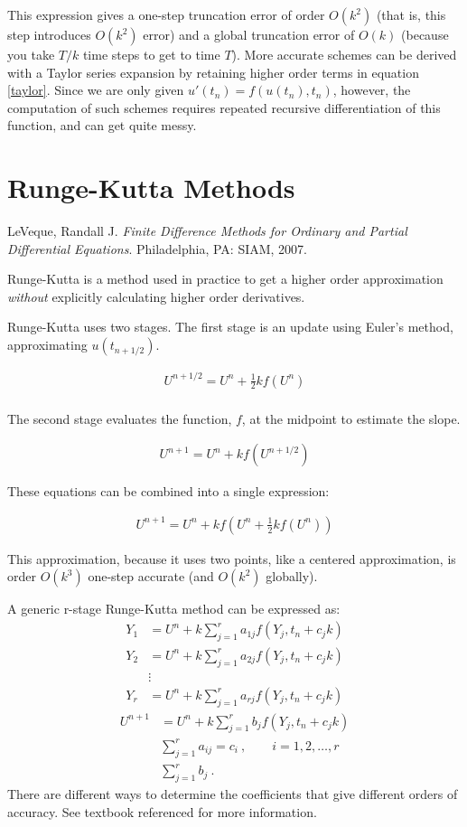 \documentclass[12pt]{article}
\begin{document}
This expression gives a one-step truncation error of order $O(k^2)$ (that is, this step introduces $O(k^2)$ error) and a global truncation error of $O(k)$ (because you take $T/k$ time steps to get to time $T$). More 
accurate schemes can be derived with a Taylor series expansion by retaining 
higher order terms in equation \eqref{taylor}. Since we are only given 
$u'(t_n) = f(u(t_n),t_n)$, however, the computation of such schemes requires 
repeated recursive differentiation of this function, and can get quite messy.


\section*{Runge-Kutta Methods}
LeVeque, Randall J. \textit{Finite Difference Methods for Ordinary and Partial Differential Equations}. Philadelphia, PA: SIAM, 2007. 

Runge-Kutta is a method used in practice to get a higher order approximation 
\emph{without} explicitly calculating higher order derivatives.

Runge-Kutta uses two stages. The first stage is an update using Euler's method, 
approximating $u(t_{n+1/2})$. 

\begin{align}
U^{n+1/2} = U^n + \frac{1}{2}kf(U^n)\\
\end{align}

The second stage evaluates the function, $f$, at the midpoint to estimate the 
slope.

\begin{align}
U^{n+1} = U^n + kf(U^{n+1/2})
\end{align}

These equations can be combined into a single expression:

\begin{align}
U^{n+1} = U^n + kf(U^n + \frac{1}{2}kf(U^n))
\end{align}

This approximation, because it uses two points, like a centered approximation, 
is order $O(k^3)$ one-step accurate (and $O(k^2)$ globally).

A generic r-stage Runge-Kutta method can be expressed as:
\begin{align}
Y_1 &= U^n + k\sum_{j=1}^r a_{1j}f(Y_j, t_n + c_jk)\\
Y_2 &= U^n + k\sum_{j=1}^r a_{2j}f(Y_j, t_n + c_jk)\\
&\vdots\nonumber\\
Y_r &= U^n + k\sum_{j=1}^r a_{rj}f(Y_j, t_n + c_jk)
\end{align}
\begin{align}
U^{n+1} &= U^n + k\sum_{j=1}^r b_{j}f(Y_j, t_n + c_jk)\\
&\sum_{j=1}^r a_{ij} = c_i\:, \qquad i = 1, 2, \dots, r \\
&\sum_{j=1}^r b_{j} \:.
\end{align}
There are different ways to determine the coefficients that give different orders of accuracy. See textbook referenced for more information.
\end{document}
